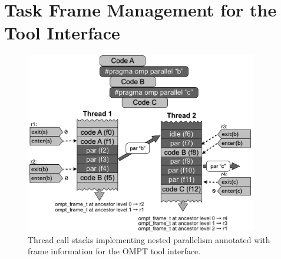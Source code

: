 %
%
%
%
%
%
%
%
%
%


\chapter{Task Frame Management for the Tool Interface}
\label{app:frames}


   \begin{figure}[h]
    \centering
        \includegraphics[width=4in]{callstack-cropped.pdf}
    \caption{Thread call stacks implementing nested parallelism
      annotated with frame information for the OMPT tool interface.}
    \label{fig:frame}
\end{figure}

